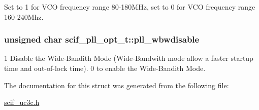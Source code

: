 \-Set to 1 for \-V\-C\-O frequency range 80-\/180\-M\-Hz, set to 0 for \-V\-C\-O frequency range 160-\/240\-Mhz. 

\hypertarget{structscif__pll__opt__t_a4740e279139f74bfc8e5b0a03877afea}{
\subsubsection[{pll\-\_\-wbwdisable}]{\setlength{\rightskip}{0pt plus 5cm}unsigned char {\bf scif\-\_\-pll\-\_\-opt\-\_\-t\-::pll\-\_\-wbwdisable}}}
\label{structscif__pll__opt__t_a4740e279139f74bfc8e5b0a03877afea}


1 \-Disable the \-Wide-\/\-Bandith \-Mode (\-Wide-\/\-Bandwith mode allow a faster startup time and out-\/of-\/lock time). 0 to enable the \-Wide-\/\-Bandith \-Mode. 



\-The documentation for this struct was generated from the following file\-:\begin{DoxyCompactItemize}
\item 
\hyperlink{scif__uc3c_8h}{scif\-\_\-uc3c.\-h}\end{DoxyCompactItemize}
